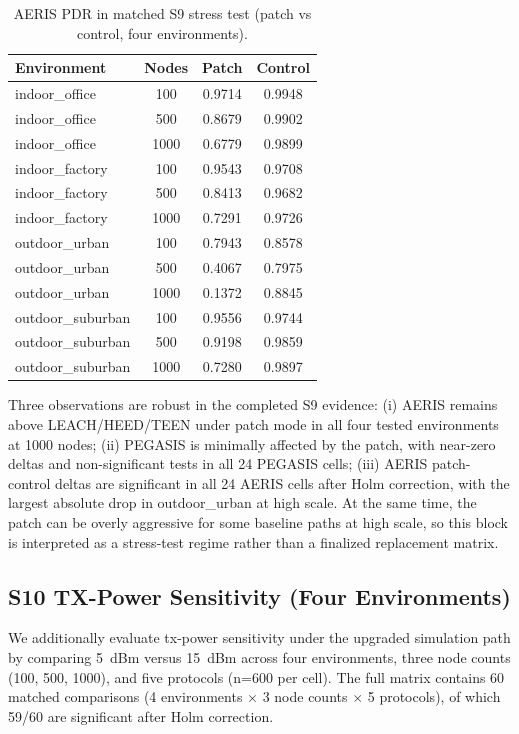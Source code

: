 \documentclass[sensors,article,submit,moreauthors,pdftex]{Definitions/mdpi}
\begin{document}
\begin{table}[H]
\caption{AERIS PDR in matched S9 stress test (patch vs control, four environments).}
\label{tab:s9_patch_control}
\centering
\begin{tabular}{lccc}
\toprule
Environment & Nodes & Patch & Control \\
\midrule
indoor\_office & 100  & 0.9714 & 0.9948 \\
indoor\_office & 500  & 0.8679 & 0.9902 \\
indoor\_office & 1000 & 0.6779 & 0.9899 \\
indoor\_factory & 100  & 0.9543 & 0.9708 \\
indoor\_factory & 500  & 0.8413 & 0.9682 \\
indoor\_factory & 1000 & 0.7291 & 0.9726 \\
outdoor\_urban & 100  & 0.7943 & 0.8578 \\
outdoor\_urban & 500  & 0.4067 & 0.7975 \\
outdoor\_urban & 1000 & 0.1372 & 0.8845 \\
outdoor\_suburban & 100  & 0.9556 & 0.9744 \\
outdoor\_suburban & 500  & 0.9198 & 0.9859 \\
outdoor\_suburban & 1000 & 0.7280 & 0.9897 \\
\bottomrule
\end{tabular}
\end{table}

Three observations are robust in the completed S9 evidence: (i) AERIS remains above LEACH/HEED/TEEN under patch mode in all four tested environments at 1000 nodes; (ii) PEGASIS is minimally affected by the patch, with near-zero deltas and non-significant tests in all 24 PEGASIS cells; (iii) AERIS patch-control deltas are significant in all 24 AERIS cells after Holm correction, with the largest absolute drop in outdoor\_urban at high scale. At the same time, the patch can be overly aggressive for some baseline paths at high scale, so this block is interpreted as a stress-test regime rather than a finalized replacement matrix.

\subsection{S10 TX-Power Sensitivity (Four Environments)}
We additionally evaluate tx-power sensitivity under the upgraded simulation path by comparing \SI{5}{dBm} versus \SI{15}{dBm} across four environments, three node counts (100, 500, 1000), and five protocols (n=600 per cell). The full matrix contains 60 matched comparisons (4 environments $\times$ 3 node counts $\times$ 5 protocols), of which 59/60 are significant after Holm correction.
\end{document}
